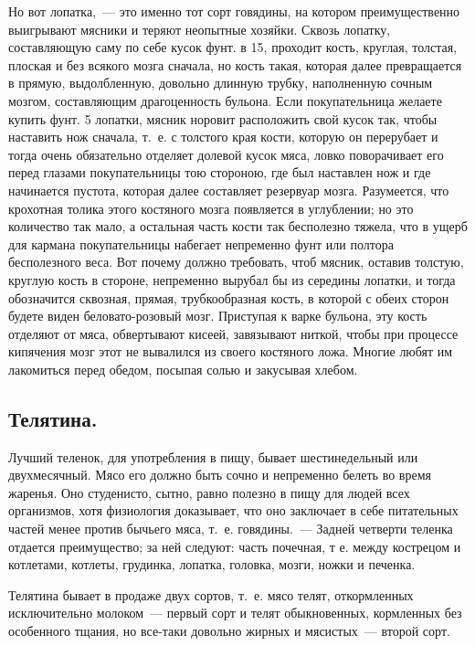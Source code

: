 Но вот лопатка,~--- это именно тот сорт говядины, на котором преимущественно выигрывают мясники и теряют неопытные хозяйки. Сквозь лопатку, составляющую саму по себе кусок фунт. в 15, проходит кость, круглая, толстая, плоская и без всякого мозга сначала, но кость такая, которая далее превращается в прямую, выдолбленную, довольно длинную трубку, наполненную сочным мозгом, составляющим драгоценность бульона. Если покупательница желаете купить фунт. 5 лопатки, мясник норовит расположить свой кусок так, чтобы наставить нож сначала, т.~е. с толстого края кости, которую он перерубает и тогда очень обязательно отделяет долевой кусок мяса, ловко поворачивает его перед глазами покупательницы тою стороною, где был наставлен нож и где начинается пустота, которая далее составляет резервуар мозга. Разумеется, что крохотная толика этого костяного мозга появляется в углублении; но это количество так мало, а остальная часть кости так бесполезно тяжела, что в ущерб для кармана покупательницы набегает непременно фунт или полтора бесполезного веса. Вот почему должно требовать, чтоб мясник, оставив толстую, круглую кость в стороне, непременно вырубал бы из середины лопатки, и тогда обозначится сквозная, прямая, трубкообразная кость, в которой с обеих сторон будете виден беловато-розовый мозг. Приступая к варке бульона, эту кость отделяют от мяса, обвертывают кисеей, завязывают ниткой, чтобы при процессе кипячения мозг этот не вывалился из своего костяного ложа. Многие любят им лакомиться перед обедом, посыпая солью и закусывая хлебом.

\subsection{Телятина.}
Лучший теленок, для употребления в пищу, бывает шестинедельный или двухмесячный. Мясо его должно быть сочно и непременно белеть во время жаренья. Оно студенисто, сытно, равно полезно в пищу для людей всех организмов, хотя физиология доказывает, что оно заключает в себе питательных частей менее против бычьего мяса, т.~е. говядины.~--- Задней четверти теленка отдается преимущество; за ней следуют: часть почечная, т е. между кострецом и котлетами, котлеты, грудинка, лопатка, головка, мозги, ножки и печенка.

Телятина бывает в продаже двух сортов, т.~е. мясо телят, откормленных исключительно молоком~--- первый сорт и телят обыкновенных, кормленных без особенного тщания, но все-таки довольно жирных и мясистых~--- второй сорт.

